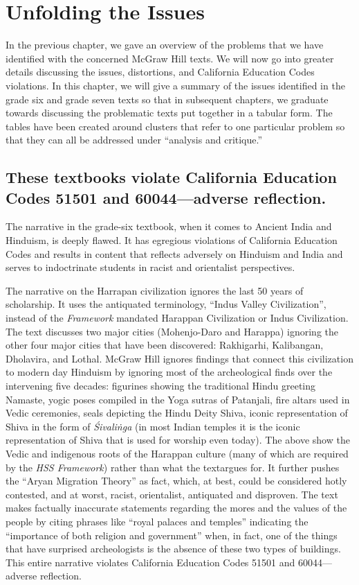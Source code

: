 \chapter{Unfolding the Issues}

In the previous chapter, we gave an overview of the problems that we have identified with the concerned McGraw Hill texts. We will now go into greater details discussing the issues, distortions, and California Education Codes violations. In this chapter, we will give a summary of the issues identified in the grade six and grade seven texts so that in subsequent chapters, we graduate towards discussing the problematic texts put together in a tabular form. The tables have been created around clusters that refer to one particular problem so that they can all be addressed under “analysis and critique.”  
\vskip -10pt

\section*{These textbooks violate California Education Codes 51501 and 60044—adverse reflection.} 
\vskip -6pt

The narrative in the grade-six textbook, when it comes to Ancient India and Hinduism, is deeply flawed. It has egregious violations of California Education Codes and results in content that reflects adversely on Hinduism and India and serves to indoctrinate students in racist and orientalist perspectives.

The narrative on the Harrapan civilization ignores the last 50 years of scholarship. It uses the antiquated terminology, “Indus Valley Civilization”, instead of the \textit{Framework} mandated Harappan Civilization or Indus Civilization. The text discusses two major cities (Mohenjo-Daro and Harappa) ignoring the other four major cities that have been discovered: Rakhigarhi, Kalibangan, Dholavira, and Lothal. McGraw Hill ignores findings that connect this civilization to modern day Hinduism by ignoring most of the archeological finds over the intervening five decades: figurines showing the traditional Hindu greeting Namaste, yogic poses compiled in the Yoga sutras of Patanjali, fire altars used in Vedic ceremonies, seals depicting the Hindu Deity Shiva, iconic representation of Shiva in the form of \textit{Śivaliṅga}  (in most Indian temples it is the iconic representation of Shiva that is used for worship even today). The above show the Vedic and indigenous roots of the Harappan culture (many of which are required by the \textit{HSS Framework}) rather than what the text\break argues for. It further pushes the “Aryan Migration Theory” as fact, which, at best, could be considered hotly contested, and at worst, racist, orientalist, antiquated and disproven. The text makes factually inaccurate statements regarding the mores and the values of the people by citing phrases like “royal palaces and temples” indicating the “importance of both religion and government” when, in fact, one of the things that have surprised archeologists is the absence of these two types of buildings. This entire narrative violates California Education Codes 51501 and 60044—adverse reflection.  

